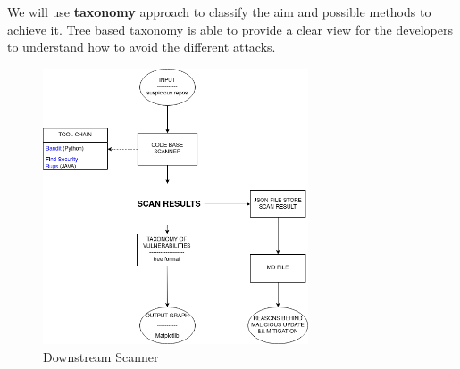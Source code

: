\begin{enumerate}
    We will use \textbf{taxonomy} approach to classify the aim and possible methods to achieve it. Tree based taxonomy is able to 
    provide a clear view for the developers to understand how to avoid the different attacks. 
    \begin{figure}
        \centering
        \includegraphics[width=0.7\textwidth]{./screenshot/downstream_scanner.png}
        \caption{Downstream Scanner}
        \label{fig:downstream-scanner}
    \end{figure}
\end{enumerate}

